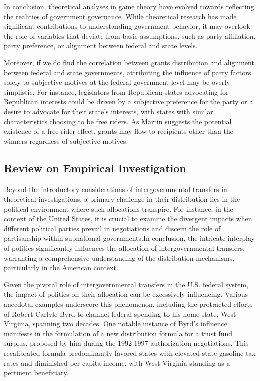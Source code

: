In conclusion, theoretical analyses in game theory have evolved towards reflecting the realities of government governance. While theoretical research has made significant contributions to understanding government behavior, it may overlook the role of variables that deviate from basic assumptions, such as party affiliation, party preference, or alignment between federal and state levels.

Moreover, if we do find the correlation between grants distribution and alignment between federal and state governments, attributing the influence of party factors solely to subjective motives at the federal government level may be overly simplistic. For instance, legislators from Republican states advocating for Republican interests could be driven by a subjective preference for the party or a desire to advocate for their state's interests, with states with similar characteristics choosing to be free riders. As Martin suggests the potential existence of a free rider effect, grants may flow to recipients other than the winners regardless of subjective motives.

\subsection{Review on Empirical Investigation}


Beyond the introductory considerations of intergovernmental transfers in theoretical investigations, a primary challenge in their distribution lies in the political environment where such allocations transpire.  For instance, in the context of the United States, it is crucial to examine the divergent impacts when different political parties prevail in negotiations and discern the role of partisanship within subnational governments.In conclusion, the intricate interplay of politics significantly influences the allocation of intergovernmental transfers, warranting a comprehensive understanding of the distribution mechanisms, particularly in the American context.

Given the pivotal role of intergovernmental transfers in the U.S. federal system, the impact of politics on their allocation can be excessively influencing. Various anecdotal examples underscore this phenomenon, including the protracted efforts of Robert Carlyle Byrd to channel federal spending to his home state, West Virginia, spanning two decades. One notable instance of Byrd's influence manifests in the formulation of a new distribution formula for a trust fund surplus, proposed by him during the 1992-1997 authorization negotiations. This recalibrated formula predominantly favored states with elevated state gasoline tax rates and diminished per capita income, with West Virginia standing as a pertinent beneficiary.%


